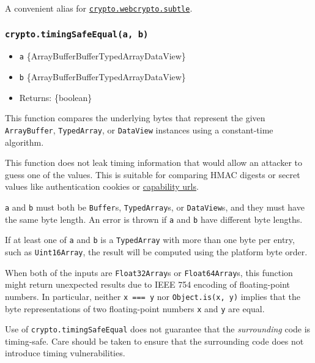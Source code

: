 A convenient alias for
\href{webcrypto.md\#class-subtlecrypto}{\texttt{crypto.webcrypto.subtle}}.

\subsubsection{\texorpdfstring{\texttt{crypto.timingSafeEqual(a,\ b)}}{crypto.timingSafeEqual(a, b)}}\label{crypto.timingsafeequala-b}

\begin{itemize}
\tightlist
\item
  \texttt{a}
  \{ArrayBuffer\textbar Buffer\textbar TypedArray\textbar DataView\}
\item
  \texttt{b}
  \{ArrayBuffer\textbar Buffer\textbar TypedArray\textbar DataView\}
\item
  Returns: \{boolean\}
\end{itemize}

This function compares the underlying bytes that represent the given
\texttt{ArrayBuffer}, \texttt{TypedArray}, or \texttt{DataView}
instances using a constant-time algorithm.

This function does not leak timing information that would allow an
attacker to guess one of the values. This is suitable for comparing HMAC
digests or secret values like authentication cookies or
\href{https://www.w3.org/TR/capability-urls/}{capability urls}.

\texttt{a} and \texttt{b} must both be \texttt{Buffer}s,
\texttt{TypedArray}s, or \texttt{DataView}s, and they must have the same
byte length. An error is thrown if \texttt{a} and \texttt{b} have
different byte lengths.

If at least one of \texttt{a} and \texttt{b} is a \texttt{TypedArray}
with more than one byte per entry, such as \texttt{Uint16Array}, the
result will be computed using the platform byte order.

When both of the inputs are \texttt{Float32Array}s or
\texttt{Float64Array}s, this function might return unexpected results
due to IEEE 754 encoding of floating-point numbers. In particular,
neither \texttt{x\ ===\ y} nor \texttt{Object.is(x,\ y)} implies that
the byte representations of two floating-point numbers \texttt{x} and
\texttt{y} are equal.

Use of \texttt{crypto.timingSafeEqual} does not guarantee that the
\emph{surrounding} code is timing-safe. Care should be taken to ensure
that the surrounding code does not introduce timing vulnerabilities.

